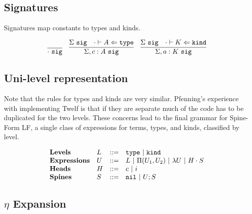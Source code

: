 \documentclass[11pt,twoside]{article}
\begin{document}
\subsection{Signatures}

Signatures map constants to types and kinds.

\newcommand{\Sig}{\ \mathtt{sig}}
\bigskip 
\framebox{$\Sigma\Sig$}
\bigskip 

$$
\begin{array}{ccc}
\infer{\cdot\Sig}{}&
\infer{\Sigma,c:A\Sig}{\Sigma\Sig & \CheckTy[\cdot]{A}{\Type}}&
\infer{\Sigma,a:K\Sig}{\Sigma\Sig & \CheckTy[\cdot]{K}{\Kind}}
\end{array} 
$$


\subsection{Uni-level representation}

Note that the rules for types and kinds are very similar.
Pfenning's experience with implementing Twelf is that if they
are separate much of the code has to be duplicated for
the two levels.  These concerns lead to the final 
grammar for Spine-Form LF, a single class of expressions for
terms, types, and kinds, classified by level.

$$
\begin{array}{llll}
\mathbf{Levels} & L & ::= & \mathtt{type} \ |\  \mathtt{kind} \\
\mathbf{Expressions} & U & ::= & L \ |\  \Pi(U_1,U_2) \ |\  \lambda U \ |\  H\cdot S \\
\mathbf{Heads} & H & ::= & c \ |\  i\\
\mathbf{Spines} & S & ::= & \mathtt{nil} \ |\  U;S\\
\end{array} 
$$


\subsection{$\eta$ Expansion}
\end{document}
